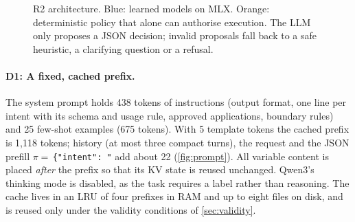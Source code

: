 \documentclass[10pt,twocolumn,letterpaper]{article}
\theoremstyle{definition}
\begin{document}
\begin{figure}[t]
{}
\caption{R2 architecture. Blue: learned models on MLX. Orange: deterministic policy that alone can
authorise execution. The LLM only proposes a JSON decision; invalid proposals fall back to a safe
heuristic, a clarifying question or a refusal.}
\label{fig:arch}
\end{figure}

\paragraph{D1: A fixed, cached prefix.}
The system prompt holds 438 tokens of instructions (output format, one line per intent with its
schema and usage rule, approved applications, boundary rules) and 25 few-shot examples (675 tokens).
With 5 template tokens the cached prefix is 1{,}118 tokens; history (at most three compact turns),
the request and the JSON prefill $\pi=$\,\texttt{\{"intent": "} add about 22
(\cref{fig:prompt}). All variable content is placed \emph{after} the prefix so that its KV state is
reused unchanged. Qwen3's thinking mode is disabled, as the task requires a label rather than
reasoning. The cache lives in an LRU of four prefixes in RAM and up to eight files on disk, and is
reused only under the validity conditions of \cref{sec:validity}.
\end{document}
